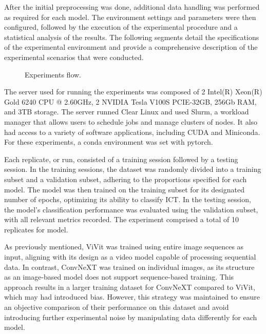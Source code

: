 After the initial preprocessing was done, additional data handling was performed as required for each model. The environment settings and parameters were then configured, followed by the execution of the experimental procedure and a statistical analysis of the results. The following segments detail the specifications of the experimental environment and provide a comprehensive description of the experimental scenarios that were conducted.

\begin{figure}[h]
    \centering
    \scalebox{0.4}{}
    \caption{Experiments flow.}
    \label{fig:experiments_flow}
\end{figure}


The server used for running the experiments was composed of 2 Intel(R) Xeon(R) Gold 6240 CPU @ 2.60GHz, 2 NVIDIA Tesla V100S PCIE-32GB, 256Gb RAM, and 3TB storage. The server runned Clear Linux and used Slurm, a workload manager that allows users to schedule jobs and manage clusters of nodes. It also had access to a variety of software applications, including CUDA and Miniconda. For these experiments, a conda environment was set with pytorch.


Each replicate, or run, consisted of a training session followed by a testing session. In the training sessions, the dataset was randomly divided into a training subset and a validation subset, adhering to the proportions specified for each model. The model was then trained on the training subset for its designated number of epochs, optimizing its ability to classify ICT. In the testing session, the model's classification performance was evaluated using the validation subset, with all relevant metrics recorded. The experiment comprised a total of 10 replicates for model.

As previously mentioned, ViVit was trained using entire image sequences as input, aligning with its design as a video model capable of processing sequential data. In contrast, ConvNeXT was trained on individual images, as its structure as an image-based model does not support sequence-based training. This approach results in a larger training dataset for ConvNeXT compared to ViVit, which may had introduced bias. However, this strategy was maintained to ensure an objective comparison of their performance on this dataset and avoid introducing further experimental noise by manipulating data differently for each model.

